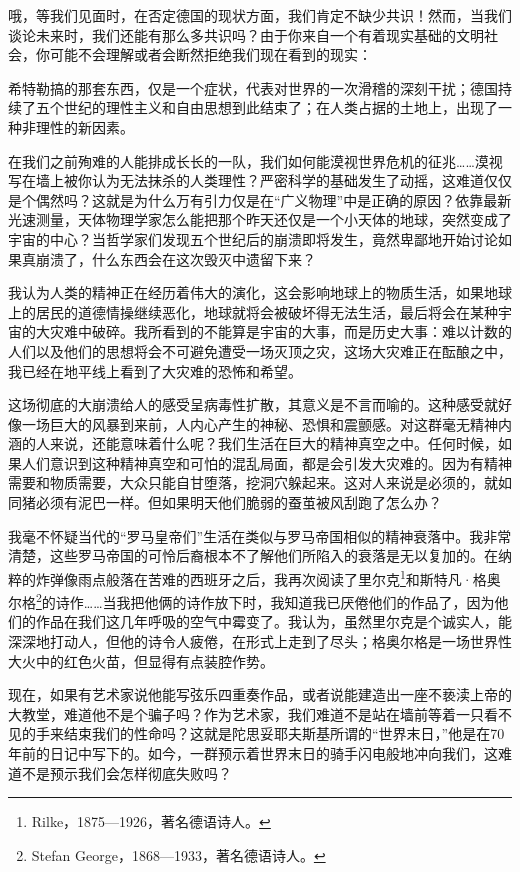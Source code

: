 \documentclass[UTF8]{ctexart}
\begin{document}
哦，等我们见面时，在否定德国的现状方面，我们肯定不缺少共识！然而，当我们谈论未来时，我们还能有那么多共识吗？由于你来自一个有着现实基础的文明社会，你可能不会理解或者会断然拒绝我们现在看到的现实：

希特勒搞的那套东西，仅是一个症状，代表对世界的一次滑稽的深刻干扰；德国持续了五个世纪的理性主义和自由思想到此结束了；在人类占据的土地上，出现了一种非理性的新因素。

在我们之前殉难的人能排成长长的一队，我们如何能漠视世界危机的征兆……漠视写在墙上被你认为无法抹杀的人类理性？严密科学的基础发生了动摇，这难道仅仅是个偶然吗？这就是为什么万有引力仅是在“广义物理”中是正确的原因？依靠最新光速测量，天体物理学家怎么能把那个昨天还仅是一个小天体的地球，突然变成了宇宙的中心？当哲学家们发现五个世纪后的崩溃即将发生，竟然卑鄙地开始讨论如果真崩溃了，什么东西会在这次毁灭中遗留下来？

我认为人类的精神正在经历着伟大的演化，这会影响地球上的物质生活，如果地球上的居民的道德情操继续恶化，地球就将会被破坏得无法生活，最后将会在某种宇宙的大灾难中破碎。我所看到的不能算是宇宙的大事，而是历史大事：难以计数的人们以及他们的思想将会不可避免遭受一场灭顶之灾，这场大灾难正在酝酿之中，我已经在地平线上看到了大灾难的恐怖和希望。

这场彻底的大崩溃给人的感受呈病毒性扩散，其意义是不言而喻的。这种感受就好像一场巨大的风暴到来前，人内心产生的神秘、恐惧和震颤感。对这群毫无精神内涵的人来说，还能意味着什么呢？我们生活在巨大的精神真空之中。任何时候，如果人们意识到这种精神真空和可怕的混乱局面，都是会引发大灾难的。因为有精神需要和物质需要，大众只能自甘堕落，挖洞穴躲起来。这对人来说是必须的，就如同猪必须有泥巴一样。但如果明天他们脆弱的蚕茧被风刮跑了怎么办？

我毫不怀疑当代的“罗马皇帝们”生活在类似与罗马帝国相似的精神衰落中。我非常清楚，这些罗马帝国的可怜后裔根本不了解他们所陷入的衰落是无以复加的。在纳粹的炸弹像雨点般落在苦难的西班牙之后，我再次阅读了里尔克\footnote{Rilke，1875—1926，著名德语诗人。}和斯特凡·格奥尔格\footnote{Stefan George，1868—1933，著名德语诗人。}的诗作……当我把他俩的诗作放下时，我知道我已厌倦他们的作品了，因为他们的作品在我们这几年呼吸的空气中霉变了。我认为，虽然里尔克是个诚实人，能深深地打动人，但他的诗令人疲倦，在形式上走到了尽头；格奥尔格是一场世界性大火中的红色火苗，但显得有点装腔作势。

现在，如果有艺术家说他能写弦乐四重奏作品，或者说能建造出一座不亵渎上帝的大教堂，难道他不是个骗子吗？作为艺术家，我们难道不是站在墙前等着一只看不见的手来结束我们的性命吗？这就是陀思妥耶夫斯基所谓的“世界末日，”他是在70年前的日记中写下的。如今，一群预示着世界末日的骑手闪电般地冲向我们，这难道不是预示我们会怎样彻底失败吗？
\end{document}
